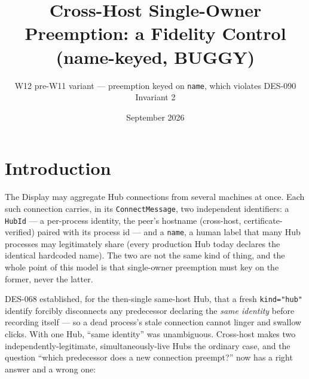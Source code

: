\documentclass[a4paper,10pt,fleqn]{article}
\begin{document}
\title{Cross-Host Single-Owner Preemption:
a Fidelity Control (name-keyed, BUGGY)}
\author{W12 pre-W11 variant --- preemption keyed on \texttt{name}, which
violates DES-090 Invariant 2}
\date{September 2026}
\maketitle

\noindent{}
\vspace{1em}

\section{Introduction}

The Display may aggregate Hub connections from several machines at once.
Each such connection carries, in its \texttt{ConnectMessage}, two
independent identifiers: a \texttt{HubId} --- a per-process identity, the
peer's hostname (cross-host, certificate-verified) paired with its
process id --- and a \texttt{name}, a human label that many Hub processes
may legitimately share (every production Hub today declares the identical
hardcoded name).  The two are not the same kind of thing, and the whole
point of this model is that single-owner preemption must key on the
former, never the latter.

DES-068 established, for the then-single same-host Hub, that a fresh
\texttt{kind="hub"} identify forcibly disconnects any predecessor
declaring the \emph{same identity} before recording itself --- so a dead
process's stale connection cannot linger and swallow clicks.  With one
Hub, ``same identity'' was unambiguous.  Cross-host makes two
independently-legitimate, simultaneously-live Hubs the ordinary case, and
the question ``which predecessor does a new connection preempt?'' now has
a right answer and a wrong one:
\end{document}
